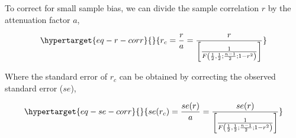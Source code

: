 \documentclass[
  letterpaper,
  DIV=11,
  numbers=noendperiod]{scrreprt}
\begin{document}
To correct for small sample bias, we can divide the sample correlation
\(r\) by the attenuation factor \(a\),

\begin{equation}\protect\hypertarget{eq-r-corr}{}{
r_c = \frac{r}{a} = \frac{r}{\left[\frac{1}{F\left(\frac{1}{2},\frac{1}{2};\frac{n-1}{2};1-r^2\right)}\right]}
}\label{eq-r-corr}\end{equation}

Where the standard error of \(r_c\) can be obtained by correcting the
observed standard error (\(se\)),

\begin{equation}\protect\hypertarget{eq-se-corr}{}{
se(r_c) = \frac{se(r)}{a} = \frac{se(r)}{\left[\frac{1}{F\left(\frac{1}{2},\frac{1}{2};\frac{n-1}{2};1-r^2\right)}\right]}
}\label{eq-se-corr}\end{equation}
\end{document}
